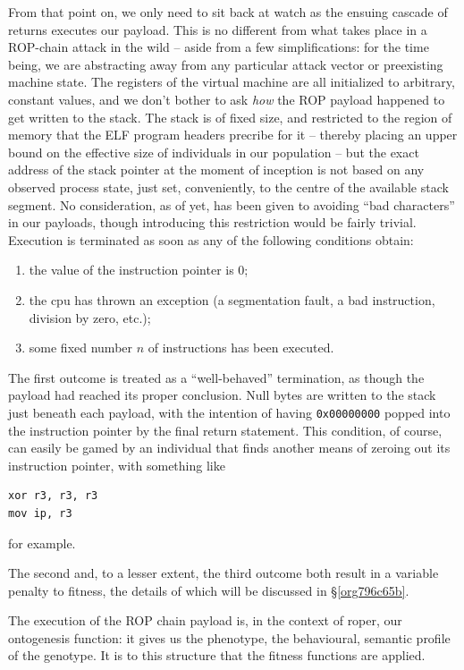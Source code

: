 \documentclass[12pt,glossary]{dalthesis}
\begin{document}
From that point on, we only need to sit back at watch as the ensuing cascade of
returns executes our payload. This is no different from what takes place in
a ROP-chain attack in the wild -- aside from a few simplifications: for the time
being, we are abstracting away from any particular attack vector or preexisting
machine state. The registers of the virtual machine are all initialized to arbitrary,
constant values, and we don't bother to ask \emph{how} the ROP payload happened to get
written to the stack. The stack is of fixed size, and restricted to the region
of memory that the ELF program headers precribe for it -- thereby placing an upper
bound on the effective size of individuals in our population -- but the exact
address of the stack pointer at the moment of inception is not based on any
observed process state, just set, conveniently, to the centre of the available
stack segment. No consideration, as of yet, has been given to avoiding ``bad
characters'' in our payloads, though introducing this restriction would be fairly
trivial. Execution is terminated as soon as any of the following conditions obtain:
\begin{enumerate}
\item the value of the instruction pointer is 0;
\item the \gls{cpu} has thrown an exception (a segmentation fault, a bad instruction,
division by zero, etc.);
\item some fixed number \(n\) of instructions has been executed.
\end{enumerate}

The first outcome is treated as a ``well-behaved'' termination, as though the
payload had reached its proper conclusion. Null bytes are written to the
stack just beneath each payload, with the intention of having \texttt{0x00000000}
popped into the instruction pointer by the final return statement. This condition, 
of course, can easily be gamed by an individual that finds another means of
zeroing out its instruction pointer, with something like
\begin{verbatim}
xor r3, r3, r3
mov ip, r3
\end{verbatim}
for example. 

The second and, to a lesser extent, the third outcome both result in a variable
penalty to fitness, the details of which will be discussed in \S \ref{org796c65b}.

The execution of the ROP chain payload is, in the context of \gls{roper}, our
ontogenesis function: it gives us the phenotype, the behavioural, semantic
profile of the genotype. It is to this structure that the fitness functions
are applied. 
\end{document}
